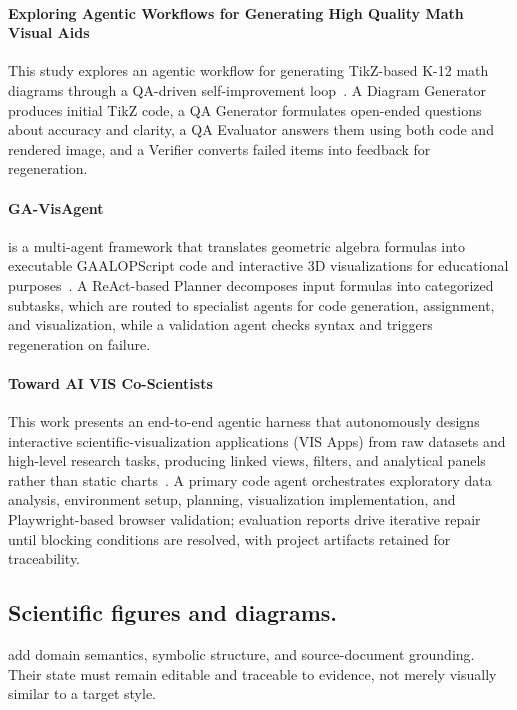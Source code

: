 \paragraph{Exploring Agentic Workflows for Generating High Quality Math Visual Aids}
This study explores an agentic workflow for generating TikZ-based K-12 math diagrams through a QA-driven self-improvement loop~\cite{avg260709839}. A Diagram Generator produces initial TikZ code, a QA Generator formulates open-ended questions about accuracy and clarity, a QA Evaluator answers them using both code and rendered image, and a Verifier converts failed items into feedback for regeneration.

\paragraph{GA-VisAgent}
 is a multi-agent framework that translates geometric algebra formulas into executable GAALOPScript code and interactive 3D visualizations for educational purposes~\cite{avg260501299}. A ReAct-based Planner decomposes input formulas into categorized subtasks, which are routed to specialist agents for code generation, assignment, and visualization, while a validation agent checks syntax and triggers regeneration on failure.

\paragraph{Toward AI VIS Co-Scientists}
This work presents an end-to-end agentic harness that autonomously designs interactive scientific-visualization applications (VIS Apps) from raw datasets and high-level research tasks, producing linked views, filters, and analytical panels rather than static charts~\cite{avg260521825}. A primary code agent orchestrates exploratory data analysis, environment setup, planning, visualization implementation, and Playwright-based browser validation; evaluation reports drive iterative repair until blocking conditions are resolved, with project artifacts retained for traceability. 

\subsection{Scientific figures and diagrams.}
 add domain semantics, symbolic structure, and source-document grounding. Their state must remain editable and traceable to evidence, not merely visually similar to a target style.

